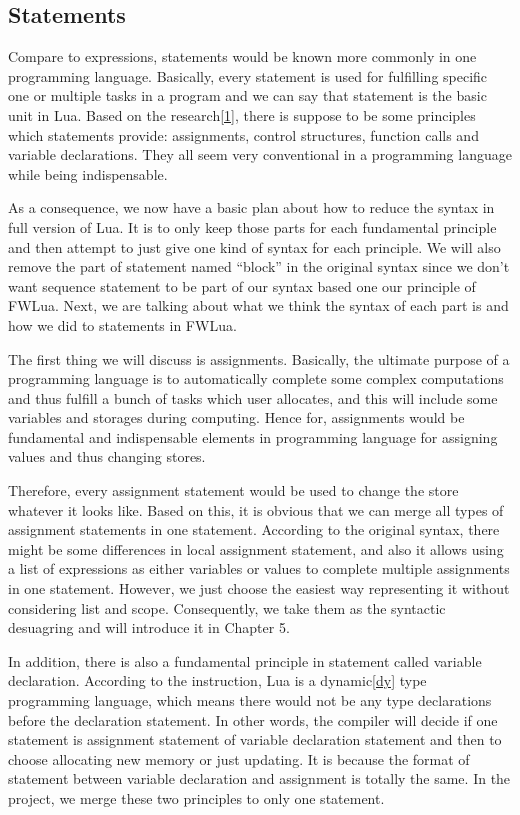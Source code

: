 \documentclass{article}
\begin{document}
\subsection{Statements}
Compare to expressions, statements would be known more commonly in one programming language. Basically, every statement is used for fulfilling specific one or multiple tasks in a program and we can say that statement is the basic unit in Lua. Based on the research\ref{1}, there is suppose to be some principles which statements provide: assignments, control structures, function calls and variable declarations. They all seem very conventional in a programming language while being indispensable. 

As a consequence, we now have a basic plan about how to reduce the syntax in full version of Lua. It is to only keep those parts for each fundamental principle and then attempt to just give one kind of syntax for each principle. We will also remove the part of statement named ``block'' in the original syntax since we don't want sequence statement to be part of our syntax based one our principle of FWLua. Next, we are talking about what we think the syntax of each part is and how we did to statements in FWLua. 

The first thing we will discuss is assignments. Basically, the ultimate purpose of a programming language is to automatically complete some complex computations and thus fulfill a bunch of tasks which user allocates, and this will include some variables and storages during computing. Hence for, assignments would be fundamental and indispensable elements in programming language for assigning values and thus changing stores. 

Therefore, every assignment statement would be used to change the store whatever it looks like. Based on this, it is obvious that we can merge all types of assignment statements in one statement. According to the original syntax, there might be some differences in local assignment statement, and also it allows using a list of expressions as either variables or values to complete multiple assignments in one statement. However, we just choose the easiest way representing it without considering list and scope. Consequently, we take them as the syntactic desuagring and will introduce it in Chapter 5.

In addition, there is also a fundamental principle in statement called variable declaration. According to the instruction, Lua is a dynamic\ref{dy} type programming language, which means there would not be any type declarations before the declaration statement. In other words, the compiler will decide if one statement is assignment statement of variable declaration statement and then to choose allocating new memory or just updating. It is because the format of statement between variable declaration and assignment is totally the same. In the project, we merge these two principles to only one statement.
\end{document}
